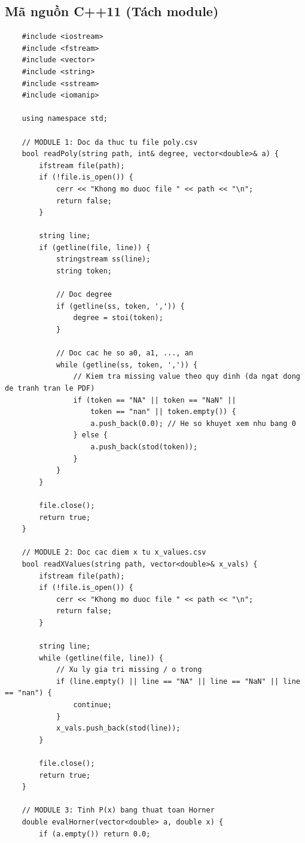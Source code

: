 \subsection{Mã nguồn C++11 (Tách module)}
    \begin{lstlisting}
    #include <iostream>
    #include <fstream>
    #include <vector>
    #include <string>
    #include <sstream>
    #include <iomanip>

    using namespace std;

    // MODULE 1: Doc da thuc tu file poly.csv
    bool readPoly(string path, int& degree, vector<double>& a) {
        ifstream file(path);
        if (!file.is_open()) {
            cerr << "Khong mo duoc file " << path << "\n";
            return false;
        }

        string line;
        if (getline(file, line)) {
            stringstream ss(line);
            string token;
            
            // Doc degree
            if (getline(ss, token, ',')) {
                degree = stoi(token);
            }
            
            // Doc cac he so a0, a1, ..., an
            while (getline(ss, token, ',')) {
                // Kiem tra missing value theo quy dinh (da ngat dong de tranh tran le PDF)
                if (token == "NA" || token == "NaN" || 
                    token == "nan" || token.empty()) {
                    a.push_back(0.0); // He so khuyet xem nhu bang 0
                } else {
                    a.push_back(stod(token));
                }
            }
        }

        file.close();
        return true;
    }

    // MODULE 2: Doc cac diem x tu x_values.csv
    bool readXValues(string path, vector<double>& x_vals) {
        ifstream file(path);
        if (!file.is_open()) {
            cerr << "Khong mo duoc file " << path << "\n";
            return false;
        }

        string line;
        while (getline(file, line)) {
            // Xu ly gia tri missing / o trong
            if (line.empty() || line == "NA" || line == "NaN" || line == "nan") {
                continue; 
            }
            x_vals.push_back(stod(line));
        }

        file.close();
        return true;
    }

    // MODULE 3: Tinh P(x) bang thuat toan Horner
    double evalHorner(vector<double> a, double x) {
        if (a.empty()) return 0.0;
        

\end{lstlisting}

